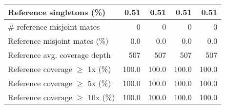 \documentclass[12pt,a4paper]{article}
\begin{document}
\begin{table}[ht]
\begin{center}
\begin{tabular}{|l*{4}{|r}|}
Reference singletons (\%) & 0.51 & 0.51 & 0.51 & 0.51 \\ \hline
\# reference misjoint mates & 0 & 0 & 0 & 0 \\ \hline
Reference misjoint mates (\%) & 0.0 & 0.0 & 0.0 & 0.0 \\ \hline
Reference avg. coverage depth & 507 & 507 & 507 & 507 \\ \hline
Reference coverage $\geq$ 1x (\%) & 100.0 & 100.0 & 100.0 & 100.0 \\ \hline
Reference coverage $\geq$ 5x (\%) & 100.0 & 100.0 & 100.0 & 100.0 \\ \hline
Reference coverage $\geq$ 10x (\%) & 100.0 & 100.0 & 100.0 & 100.0 \\ \hline
\end{tabular}
\end{center}
\end{table}
\end{document}
